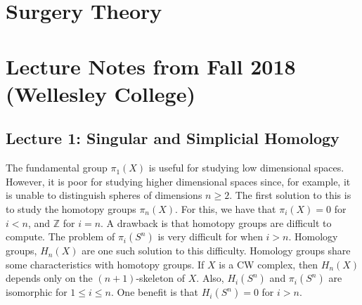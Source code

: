 \documentclass[crop=false,class=article,oneside]{standalone}
\begin{document}
    \ifx\ifmathcoursessurgery\undefined
        \section*{Surgery Theory}
        \setcounter{section}{2}
        \renewcommand\thesubfigure{%
            \arabic{section}.\arabic{figure}.\arabic{subfigure}%
        }
    \else
        \section{Lecture Notes from Fall 2018 (Wellesley College)}
    \fi
    \subsection{Lecture 1: Singular and Simplicial Homology}
        The fundamental group $\pi_{1}(X)$ is useful for
        studying low dimensional spaces. However, it is poor for
        studying higher dimensional spaces since, for example,
        it is unable to distinguish spheres of dimensions
        $n\geq 2$. The first solution to this is to study
        the homotopy groups $\pi_{n}(X)$. For this, we have
        that $\pi_{i}(X)=0$ for $i<n$, and $\mathbb{Z}$ for
        $i=n$. A drawback is that homotopy groups are
        difficult to compute. The problem of $\pi_{i}(S^{n})$
        is very difficult for when $i>n$. Homology groups,
        $H_{n}(X)$ are one such solution to this difficulty.
        Homology groups share some characteristics with
        homotopy groups. If $X$ is a CW complex, then $H_{n}(X)$
        depends only on the $(n+1)$-skeleton of $X$. Also,
        $H_{i}(S^{n})$ and $\pi_{i}(S^{n})$ are isomorphic for
        $1\leq i\leq n$. One benefit is that $H_{i}(S^{n})=0$
        for $i>n$.
\end{document}
